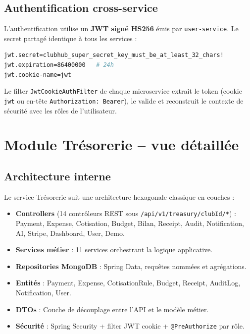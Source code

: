 \documentclass[11pt,a4paper]{article}
\begin{document}
\subsection{Authentification cross-service}

L'authentification utilise un \textbf{JWT signé HS256} émis par \texttt{user-service}. Le secret partagé identique à tous les services :

\begin{lstlisting}[language=bash, caption={Secret JWT partagé entre tous les microservices}]
jwt.secret=clubhub_super_secret_key_must_be_at_least_32_chars!
jwt.expiration=86400000   # 24h
jwt.cookie-name=jwt
\end{lstlisting}

Le filter \texttt{JwtCookieAuthFilter} de chaque microservice extrait le token (cookie \texttt{jwt} ou en-tête \texttt{Authorization: Bearer}), le valide et reconstruit le contexte de sécurité avec les rôles de l'utilisateur.

\section{Module Trésorerie -- vue détaillée}

\subsection{Architecture interne}

Le service Trésorerie suit une architecture hexagonale classique en couches :

\begin{itemize}[leftmargin=*]
  \item \textbf{Controllers} (14 contrôleurs REST sous \texttt{/api/v1/treasury/{clubId}/*}) : Payment, Expense, Cotisation, Budget, Bilan, Receipt, Audit, Notification, AI, Stripe, Dashboard, User, Demo.
  \item \textbf{Services métier} : 11 services orchestrant la logique applicative.
  \item \textbf{Repositories MongoDB} : Spring Data, requêtes nommées et agrégations.
  \item \textbf{Entités} : Payment, Expense, CotisationRule, Budget, Receipt, AuditLog, Notification, User.
  \item \textbf{DTOs} : Couche de découplage entre l'API et le modèle métier.
  \item \textbf{Sécurité} : Spring Security + filter JWT cookie + \texttt{@PreAuthorize} par rôle.
\end{itemize}
\end{document}
